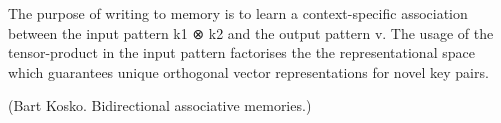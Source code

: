 The purpose of writing to memory is to learn a context-specific association between the input pattern k1 ⊗ k2 and the output pattern v. 
The usage of the tensor-product in the input pattern factorises the the representational space which guarantees unique orthogonal vector representations for novel key pairs.


(Bart Kosko. Bidirectional associative memories.)

